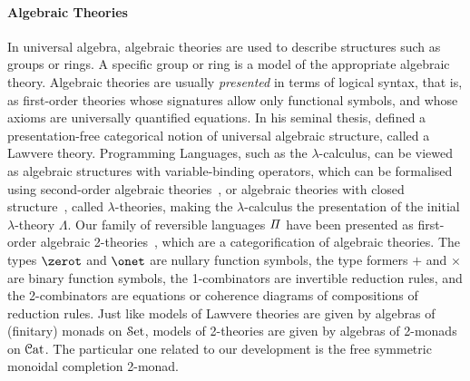 








\paragraph{Algebraic Theories} In universal algebra, algebraic theories are used to describe structures such as groups
or rings. A specific group or ring is a model of the appropriate algebraic theory. Algebraic theories are usually
\emph{presented} in terms of logical syntax, that is, as first-order theories whose signatures allow only functional
symbols, and whose axioms are universally quantified equations. In his seminal thesis,
\citet{lawvereFUNCTORIALSEMANTICSALGEBRAIC1963} defined a presentation-free categorical notion of universal algebraic
structure, called a Lawvere theory. Programming Languages, such as the $\lambda$-calculus, can be viewed as algebraic
structures with variable-binding operators, which can be formalised using second-order algebraic
theories~\cite{fioreSecondOrderAlgebraicTheories2010}, or algebraic theories with closed
structure~\cite{hylandClassicalLambdaCalculus2017}, called $\lambda$-theories, making the $\lambda$-calculus the
presentation of the initial $\lambda$-theory $\Lambda$. Our family of reversible languages $\mathit{\Pi}$ have been presented
as first-order algebraic
2-theories~\cite{cohenCoherenceRewriting2theories2009,bekeCategorificationTermRewriting2011,yanofskySyntaxCoherence2000},
which are a categorification of algebraic theories. The types $\zerot$ and $\onet$ are nullary function symbols, the
type formers $+$ and $\times$ are binary function symbols, the 1-combinators are invertible reduction rules, and the
2-combinators are equations or coherence diagrams of compositions of reduction rules. Just like models of Lawvere
theories are given by algebras of (finitary) monads on $\SetCat$, models of 2-theories are given by algebras of 2-monads
on $\CatCat$. The particular one related to our development is the free symmetric monoidal completion 2-monad.

